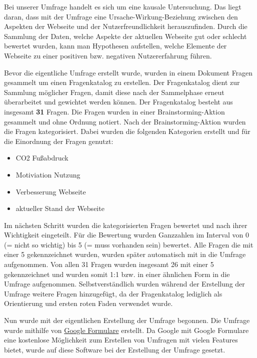 Bei unserer Umfrage handelt es sich um eine kausale Untersuchung.
Das liegt daran, dass mit der Umfrage eine Ursache-Wirkung-Beziehung zwischen den Aspekten der Webseite und der Nutzerfreundlichkeit herauszufinden.
Durch die Sammlung der Daten, welche Aspekte der aktuellen Webseite gut oder schlecht bewertet wurden, kann man Hypothesen aufstellen, welche Elemente der Webseite zu einer positiven bzw. negativen Nutzererfahrung führen.\

Bevor die eigentliche Umfrage erstellt wurde, wurden in einem Dokument Fragen gesammelt um einen Fragenkatalog zu erstellen. Der Fragenkatalog dient zur Sammlung möglicher Fragen, damit diese nach der Sammelphase erneut überarbeitet und gewichtet werden können.
Der Fragenkatalog besteht aus insgesamt \textbf{31} Fragen.
Die Fragen wurden in einer Brainstorming-Aktion gesammelt und ohne Ordnung notiert.
Nach der Brainstorming-Aktion wurden die Fragen kategorisiert.
Dabei wurden die folgenden Kategorien erstellt und für die Einordnung der Fragen genutzt:

\begin{itemize}
    \item CO2 Fußabdruck
    \item Motiviation Nutzung
    \item Verbesserung Webseite
    \item aktueller Stand der Webseite
\end{itemize}

Im nächsten Schritt wurden die kategorisierten Fragen bewertet und nach ihrer Wichtigkeit eingeteilt.
Für die Bewertung wurden Ganzzahlen im Interval von 0 (= nicht so wichtig) bis 5 (= muss vorhanden sein) bewertet.
Alle Fragen die mit einer 5 gekennzeichnet wurden, wurden später automatisch mit in die Umfrage aufgenommen.
Von allen 31 Fragen wurden insgesamt 26 mit einer 5 gekennzeichnet und wurden somit 1:1 bzw. in einer ähnlichen Form in die Umfrage aufgenommen.
Selbstverständlich wurden während der Erstellung der Umfrage weitere Fragen hinzugefügt, da der Fragenkatalog lediglich als Orientierung und ersten roten Faden verwendet wurde.\

Nun wurde mit der eigentlichen Erstellung der Umfrage begonnen.
Die Umfrage wurde mithilfe von \href{https://docs.google.com/forms/u/0/}{Google Formulare} erstellt.
Da Google mit Google Formulare eine kostenlose Möglichkeit zum Erstellen von Umfragen mit vielen Features bietet, wurde auf diese Software bei der Erstellung der Umfrage gesetzt.\

